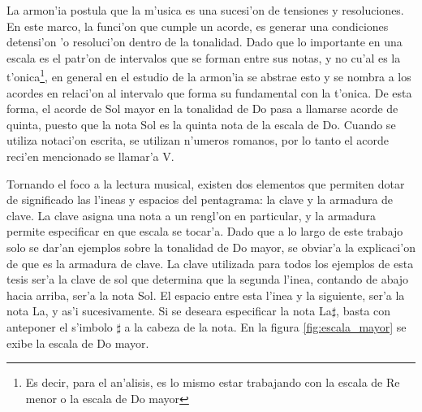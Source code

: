 La armon'ia postula que la m'usica es una sucesi'on de tensiones y resoluciones. En este marco, la funci'on que cumple un acorde, es generar una condiciones
detensi'on 'o resoluci'on dentro de la tonalidad. Dado que lo importante en una escala es el patr'on de intervalos que se forman entre sus notas, y 
no cu'al es la t'onica\footnote{Es decir, para el an'alisis, es lo mismo estar trabajando con la escala de Re menor o la escala de Do mayor}, en general en el estudio de la armon'ia se abstrae esto y se nombra a los acordes en relaci'on al intervalo que forma su
fundamental con la t'onica. De esta forma, el acorde de Sol mayor en la tonalidad de Do pasa a llamarse acorde de quinta, puesto que la nota Sol
es la quinta nota de la escala de Do. Cuando se utiliza notaci'on escrita, se utilizan n'umeros romanos, por lo tanto el acorde reci'en mencionado
se llamar'a V. 



Tornando el foco a la lectura musical, existen dos elementos que permiten dotar de significado las l'ineas y espacios del pentagrama: la clave
y la armadura de clave. La clave asigna una nota a un rengl'on en particular, y la armadura permite especificar en que escala se tocar'a. 
Dado que a lo largo de este trabajo solo se dar'an ejemplos sobre la tonalidad de Do mayor, se obviar'a la explicaci'on de que es la armadura de clave. 
La clave utilizada para todos los ejemplos de esta tesis ser'a la clave de sol que determina que la segunda l'inea, contando de abajo hacia
arriba, ser'a la nota Sol. El espacio entre esta l'inea y la siguiente, ser'a la nota La, y as'i sucesivamente. Si se deseara especificar
la nota La$\sharp$, basta con anteponer el s'imbolo $\sharp$ a la cabeza de la nota. En la figura \ref{fig:escala_mayor} se exibe la escala de Do mayor.


\begin{imagen}
    \width{12cm}
\end{imagen}
